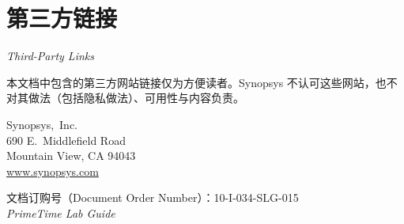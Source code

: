 \section*{第三方链接}

\noindent\textit{Third-Party Links}

本文档中包含的第三方网站链接仅为方便读者。Synopsys 不认可这些网站，也不对其做法（包括隐私做法）、可用性与内容负责。

\vspace{1.5em}
\noindent
Synopsys,~Inc.\\
690 E.\ Middlefield Road\\
Mountain View, CA 94043\\
\url{www.synopsys.com}

\vspace{1em}
\noindent
文档订购号（Document Order Number）：10-I-034-SLG-015\\
\textit{PrimeTime Lab Guide}
